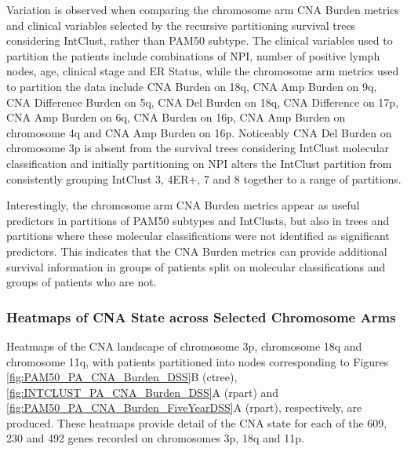 Variation is observed when comparing the chromosome arm CNA Burden metrics and clinical variables selected by the recursive partitioning survival trees considering \FloatBarrier \noindent IntClust, rather than PAM50 subtype. The clinical variables used to partition the patients include combinations of NPI, number of positive lymph nodes, age, clinical stage and ER Status, while the chromosome arm metrics used to partition the data include CNA Burden on 18q, CNA Amp Burden on 9q, CNA Difference Burden on 5q, CNA Del Burden on 18q, CNA Difference on 17p, CNA Amp Burden on 6q, CNA Burden on 16p, CNA Amp Burden on chromosome 4q and CNA Amp Burden on 16p. Noticeably CNA Del Burden on chromosome 3p is absent from the survival trees considering IntClust molecular classification and initially partitioning on NPI alters the IntClust partition from consistently grouping IntClust 3, 4ER+, 7 and 8 together to a range of partitions.

Interestingly, the chromosome arm CNA Burden metrics appear as useful predictors in partitions of PAM50 subtypes and IntClusts, but also in trees and partitions where these molecular classifications were not identified as significant predictors. This indicates that the CNA Burden metrics can provide additional survival information in groups of patients split on molecular classifications and groups of patients who are not. 

\subsubsection{Heatmaps of CNA State across Selected Chromosome Arms} 
\label{Heatmaps_Chap3}
Heatmaps of the CNA landscape of chromosome 3p, chromosome 18q and chromosome 11q, with patients partitioned into nodes corresponding to Figures \ref{fig:PAM50_PA_CNA_Burden_DSS}B (ctree), \ref{fig:INTCLUST_PA_CNA_Burden_DSS}A (rpart) and \ref{fig:PAM50_PA_CNA_Burden_FiveYearDSS}A (rpart), respectively, are produced. These heatmaps provide detail of the CNA state for each of the 609, 230 and 492 genes recorded on chromosomes 3p, 18q and 11p. 

